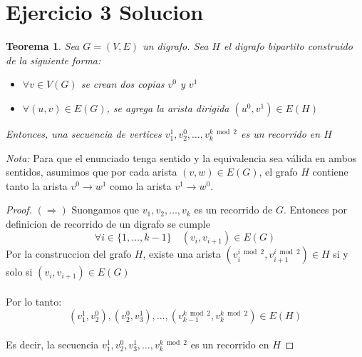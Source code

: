 \documentclass{article}
\newtheorem{theorem}{Teorema}
\begin{document}
\section{Ejercicio 3 Solucion}
\begin{theorem}
Sea $G=(V,E)$ un digrafo. Sea \textbf{$H$} el digrafo bipartito construido 
de la siguiente forma:
\begin{itemize}
  \item $\forall v \in V(G)$ se crean dos copias $v^0$ y $v^1$
  \item $\forall (u,v) \in E(G)$, se agrega la arista dirigida $(u^0,v^1) \in E(H)$
\end{itemize}
Entonces, una secuencia de vertices $v_1^1, v_2^0, \dots, v_k^{k \bmod 2}$ 
es un recorrido en $H$
\end{theorem}
\noindent\textit{Nota:} Para que el enunciado tenga sentido y la equivalencia sea válida en ambos sentidos, 
asumimos que por cada arista $(v, w) \in E(G)$, el grafo $H$ contiene tanto la arista $v^0 \to w^1$ 
como la arista $v^1 \to w^0$.

\begin{proof}
  $(\Rightarrow)$ Suongamos que $v_1,v_2, \dots, v_k$ es un recorrido de $G$. Entonces
  por definicion de recorrido de un digrafo se cumple
  \[ \forall i \in \{1, \dots, k - 1\} \quad (v_i, v_{i+1}) \in E(G) \]
  Por la construccion del grafo $H$, existe una arista $(v_i^{i \bmod 2}, v_{i+1}^{i \bmod 2}) \in H $
  si y solo si $(v_i,v_{i+1}) \in E(G)$ \\ \\
  Por lo tanto: 
  \[(v_1^1,v_2^0),(v_2^0,v_3^1), \dots, (v_{k-1}^{k \bmod 2}, v_k^{k \bmod 2}) \in E(H) \] \\
  Es decir, la secuencia $v_1^1,v_2^0,v_3^1, \dots, v_k^{k \bmod 2}$ es un recorrido en $H$
\end{proof}
\end{document}
